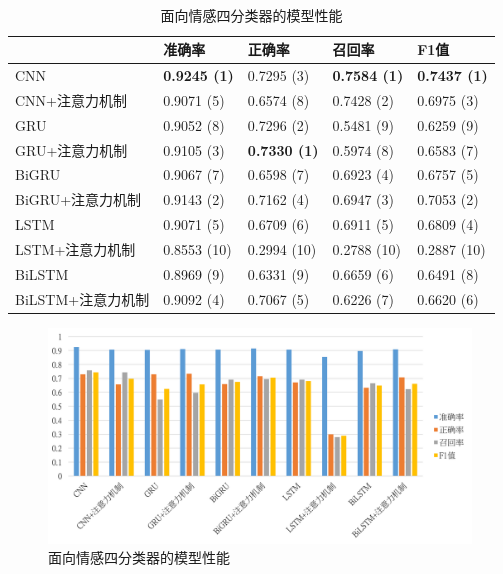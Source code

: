 \begin{table}[htb]
  \centering
  \begin{minipage}[t]{\linewidth}
  \caption{面向情感四分类器的模型性能}　
  \label{tab:exp_context_emo_0_result}
    \begin{tabularx}{\linewidth}{X|llll}
    \toprule[1.5pt]
    & 准确率 & 正确率 & 召回率 & F1值 \\
    \hline
    CNN & \bf 0.9245 (1) & 0.7295 (3) & \bf 0.7584 (1) & \bf 0.7437 (1) \\ %
    CNN+注意力机制 & 0.9071 (5) & 0.6574 (8) & 0.7428 (2) & 0.6975 (3) \\ %
    \hline
    GRU & 0.9052 (8) & 0.7296 (2) & 0.5481 (9) & 0.6259 (9) \\ %
    GRU+注意力机制 & 0.9105 (3) & \bf 0.7330 (1) & 0.5974 (8) & 0.6583 (7) \\ %
    \hline
    BiGRU & 0.9067 (7) & 0.6598 (7) & 0.6923 (4) & 0.6757 (5) \\ %
    BiGRU+注意力机制 & 0.9143 (2) & 0.7162 (4) & 0.6947 (3) & 0.7053 (2) \\ %
    \hline
    LSTM & 0.9071 (5) & 0.6709 (6) & 0.6911 (5) & 0.6809 (4) \\ %
    LSTM+注意力机制 & 0.8553 (10) & 0.2994 (10) & 0.2788 (10) & 0.2887 (10) \\ %
    \hline
    BiLSTM & 0.8969 (9) & 0.6331 (9) & 0.6659 (6) & 0.6491 (8) \\ %
    BiLSTM+注意力机制 & 0.9092 (4) & 0.7067 (5) & 0.6226 (7) & 0.6620 (6) \\ %
    \bottomrule[1.5pt]
    \end{tabularx}
  \end{minipage}
\end{table}

\begin{figure}[H]
  \centering
  \includegraphics[width=\textwidth]{img/exp_context_emo_0_result_bar.png}
  \caption{面向情感四分类器的模型性能}
  \label{fig:exp_context_emo_0_result_bar}
\end{figure}

